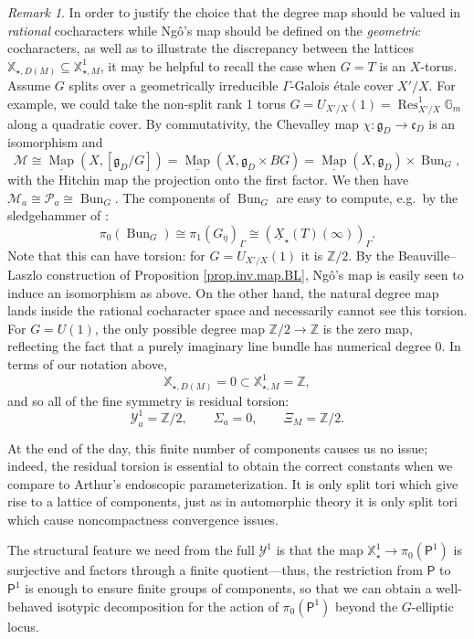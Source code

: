 \documentclass[openany]{amsbook}
\theoremstyle{definition}
\theoremstyle{remark}
\newtheorem{remark}[theorem]{Remark}
\numberwithin{equation}{section}
\newcommand{\Z}{\mathbb{Z}}
\newcommand{\G}{\mathbb{G}}
\newcommand{\cM}{\mathcal{M}}
\newcommand{\cY}{\mathcal{Y}}
\newcommand{\cP}{\mathcal{P}}
\newcommand{\ol}[1]{\overline{#1}}
\newcommand{\ul}[1]{\underline{#1}}
\renewcommand{\-}{\operatorname{-}}
\newcommand{\Map}{\ul{\operatorname{Map}}}
\newcommand{\on}[1]{\operatorname{#1}}
\newcommand{\Res}{\on{Res}}
\newcommand{\bX}{\mathbb{X}}
\newcommand{\bP}{\mathsf{P}}
\newcommand{\fc}{\mathfrak{c}}
\renewcommand{\fg}{\mathfrak{g}}
\newcommand{\Bun}{\on{Bun}}
\begin{document}
\begin{remark}\label{rmk.torus.ex.P.deg.rat}
    In order to justify the choice that the degree map should be valued in \textit{rational} cocharacters while Ng\^{o}'s map should be defined on the \textit{geometric} cocharacters, as well as to illustrate the discrepancy between the lattices $\bX_{\star, D(M)} \subseteq \bX_{\star,M}^1$, it may be helpful to recall the case when $G = T$ is an $X$-torus. Assume $G$ splits over a geometrically irreducible $\Gamma$-Galois \'etale cover $X'/X$. For example, we could take the non-split rank 1 torus $G = U_{X'/X}(1) = \Res^1_{X'/X} \G_m$ along a quadratic cover. By commutativity, the Chevalley map $\chi : \fg_D \to \fc_D$ is an isomorphism and 
    $$
        \cM \cong \Map(X, [\fg_D / G]) = \Map(X, \fg_D \times BG) = \Map(X, \fg_D) \times \Bun_G,
    $$
    with the Hitchin map the projection onto the first factor. We then have $\cM_a \cong \cP_a \cong \Bun_G$. The components of $\Bun_G$ are easy to compute, e.g.\ by the sledgehammer of \cite[Theorem 6]{HeinlothRelUnif}:
    $$
        \pi_0(\Bun_G) \cong \pi_1(G_{\ol{\eta}})_\Gamma \cong (\ul{X}_\star(T)(\infty))_\Gamma.
    $$
    Note that this can have torsion: for $G = U_{X'/X}(1)$ it is $\Z/2$. By the Beauville--Laszlo construction of Proposition \ref{prop.inv.map.BL}, Ng\^{o}'s map is easily seen to induce an isomorphism as above. On the other hand, the natural degree map lands inside the rational cocharacter space and necessarily cannot see this torsion. For $G = U(1)$, the only possible degree map $\Z/2 \to \Z$ is the zero map, reflecting the fact that a purely imaginary line bundle has numerical degree 0. In terms of our notation above,
    $$
        \bX_{\star, D(M)} = 0 \subset \bX^1_{\star,M} = \Z,
    $$
    and so all of the fine symmetry is residual torsion:
    $$
        \cY_a^1 = \Z/2, \qquad \Sigma_a = 0, \qquad \Xi_M = \Z/2.
    $$
    
    At the end of the day, this finite number of components causes us no issue; indeed, the residual torsion is essential to obtain the correct constants when we compare to Arthur's endoscopic parameterization. It is only split tori which give rise to a lattice of components, just as in automorphic theory it is only split tori which cause noncompactness convergence issues.
\end{remark}



The structural feature we need from the full $\cY^1$ is that the map $\bX_\star^1 \to \pi_0(\bP^{1})$ is surjective and factors through a finite quotient---thus, the restriction from $\bP$ to $\bP^{1}$ is enough to ensure finite groups of components, so that we can obtain a well-behaved isotypic decomposition for the action of $\pi_0(\bP^{1})$ beyond the $G$-elliptic locus.
\end{document}
